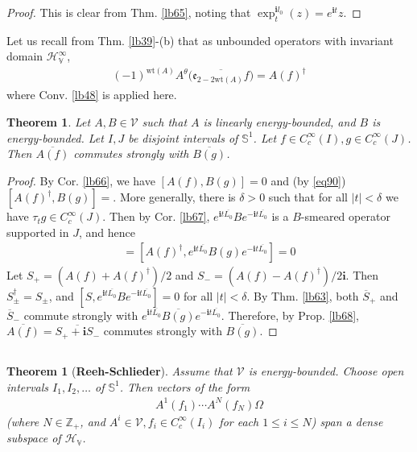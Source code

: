 \documentclass[12pt,b5paper,notitlepage]{article}
\theoremstyle{definition}
\theoremstyle{plain}
\newtheorem{thm}[df]{Theorem}
\newcommand{\mc}{\mathcal}
\newcommand{\ovl}{\overline}
\newcommand{\im}{\mathbf{i}}
\newcommand{\Zbb}{\mathbb Z}
\newcommand{\wt}{\mathrm{wt}}
\newcommand{\Sbb}{{\mathbb S}}
\newcommand{\HV}{\mathcal H_{\mathbb V}}
\newcommand{\ek}{\mathfrak{e}}
\numberwithin{equation}{section}
\begin{document}
\begin{proof}
This is clear from Thm. \ref{lb65}, noting that $\exp^{\im l_0}_t(z)=e^{\im t}z$.
\end{proof}


Let us recall from Thm. \ref{lb39}-(b) that as unbounded operators with invariant domain $\HV^\infty$, 
\begin{align}\label{eq90}
(-1)^{\wt(A)}A^\theta\big(\ovl{\ek_{2-2\wt(A)}f}\big)=A(f)^\dagger
\end{align}
where Conv. \ref{lb48} is applied here.

\begin{thm}
Let $A,B\in\mc V$ such that $A$ is linearly energy-bounded, and $B$ is energy-bounded. Let $I,J$ be disjoint intervals of $\Sbb^1$. Let $f\in C_c^\infty(I),g\in C_c^\infty(J)$. Then $\ovl{A(f)}$ commutes strongly with $\ovl{B(g)}$. 
\end{thm}


\begin{proof}
By Cor. \ref{lb66}, we have $[A(f),B(g)]=0$ and (by \eqref{eq90}) $[A(f)^\dagger,B(g)]=$. More generally, there is $\delta>0$ such that for all $|t|<\delta$ we have $\tau_tg\in C_c^\infty(J)$. Then by Cor. \ref{lb67}, $e^{\im t\ovl{L_0}}Be^{-\im t\ovl{L_0}}$ is a $B$-smeared operator supported in $J$, and hence
\begin{align*}
[A(f),e^{\im t\ovl{L_0}}B(g)e^{-\im t\ovl{L_0}}]=[A(f)^\dagger,e^{\im t\ovl{L_0}}B(g)e^{-\im t\ovl{L_0}}]=0
\end{align*} 
Let $S_+=(A(f)+A(f)^\dagger)/2$ and $S_-=(A(f)-A(f)^\dagger)/2\im$. Then $S_\pm^\dagger=S_\pm$, and $[S,e^{\im t\ovl{L_0}}Be^{-\im t\ovl{L_0}}]=0$ for all $|t|<\delta$. By Thm. \ref{lb63}, both $\ovl S_+$ and $\ovl S_-$ commute strongly with $e^{\im t\ovl{L_0}}\ovl{B(g)}e^{-\im t\ovl{L_0}}$. Therefore, by Prop. \ref{lb68}, $\ovl{A(f)}=\ovl{S_++\im S_-}$ commutes strongly with $\ovl{B(g)}$.
\end{proof}



\subsection{}


\begin{thm}[\textbf{Reeh-Schlieder}]\label{lb70}
Assume that $\mc V$ is energy-bounded. Choose open intervals $I_1,I_2,\dots$ of $\Sbb^1$. Then vectors of the form
\begin{align}\label{eq91}
A^1(f_1)\cdots A^N(f_N)\Omega
\end{align}
(where $N\in\Zbb_+$, and $A^i\in\mc V,f_i\in C_c^\infty(I_i)$ for each $1\leq i\leq N$) span a dense subspace of $\HV$.
\end{thm}
\end{document}
